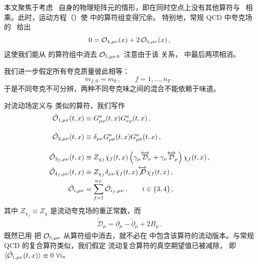 本文聚焦于考虑 \emt\ 自身的物理矩阵元的情形，即在同时空点上没有其他算符与
\emt\ 相乘。此时，运动方程（\eom{}）使  中的算符组变得冗余。
特别地，常规 QCD 中夸克场的 \eom\ 给出
\begin{equation}
  0 = \mathcal{O}_{4, \mu \nu} (x) + 2 \, \mathcal{O}_{5, \mu \nu} (x) \,,
  \label{eq:eom}
\end{equation}
这使我们能从  的算符组中消去 $\mathcal{O}_{5,\mu\nu}$。注意由于该
关系， 中最后两项相消。

我们进一步假定所有夸克质量彼此相等：
\begin{equation}
	m_{f, 0} = m_0\,, \qquad f=1,\ldots,n_F\,.
\end{equation}
于是不同夸克不可分辨，两种不同夸克味之间的混合不能依赖于味道。

对流动场定义与  类似的算符，我们写作
\begin{equation}
  \begin{split}
    \tilde{\mathcal{O}}_{1,\mu\nu}(t,x) &\equiv
    G_{\mu\rho}^a(t,x)G_{\nu\rho}^a(t,x)\,,\\[10pt]
    \tilde{\mathcal{O}}_{2,\mu\nu}(t,x) &\equiv
    \delta_{\mu\nu}G_{\rho\sigma}^a(t,x)G_{\rho\sigma}^a(t,x)\,,\\[10pt]
    \tilde{\mathcal{O}}_{3_f,\mu\nu}(t,x) &\equiv Z_{\chi_f}
    \bar\chi_{f}(t,x)\left(\gamma_\mu\overleftrightarrow{\mathcal{D}}\!_\nu
    +\gamma_\nu\overleftrightarrow{\mathcal{D}}\!_\mu\right)\chi_{f}(t,x)\,,\\
    \tilde{\mathcal{O}}_{4_f,\mu\nu}(t,x)
    &\equiv Z_{\chi_f} \delta_{\mu\nu}\bar\chi_{f}(t,x)
    \overleftrightarrow{\not{\mathcal{D}}}\chi_{f}(t,x)\,,
    \\
    \tilde{\mathcal{O}}_{i,\mu\nu} &= \sum_{f=1}^{n_F}\tilde{\mathcal{O}}_{i_f,\mu\nu}\,,\qquad i\in\{3,4\}\,,
    \label{eq:tops}
  \end{split}
\end{equation}
其中 $Z_{\chi_f}\equiv Z_\chi$ 是流动夸克场的重正常数，而
\begin{equation}
  \begin{split}
    \overleftrightarrow{\mathcal{D}}\!_\mu = \partial_\mu -
    \overleftarrow{\partial}\!_\mu + 2B_\mu\,.
    \label{eq:leftrightcalD}
  \end{split}
\end{equation}
既然已用  把 $\mathcal{O}_{5,\mu\nu}$ 从算符组中消去，就不必在
 中包含该算符的流动版本。与常规 QCD 的复合算符类似，我们假定
流动复合算符的真空期望值已被减除，
即 $\langle\tcalo_{i,\mu\nu}(t,x)\rangle\equiv 0\ \forall i$。

